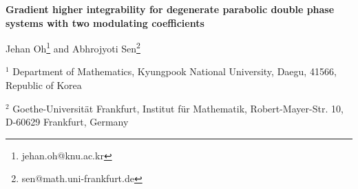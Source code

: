 \documentclass[11pt,oneside, english,reqno,twoside a4paper]{amsart}
\theoremstyle{definition}
\numberwithin{theorem}{section}
\numberwithin{equation}{section}
\DeclareMathOperator{\dv}{div}
\newcommand{\ttl}{}
\begin{document}
\title[Higher integrability for parabolic double phase problems]
{\ttl}
\begin{center}
{\bf \Large Gradient higher integrability for degenerate parabolic double phase systems with two modulating coefficients}


\medskip

{\small  Jehan Oh\footnote{jehan.oh@knu.ac.kr} and Abhrojyoti Sen\footnote{sen@math.uni-frankfurt.de}
}
\medskip

{\small
$^1$ Department of Mathematics, Kyungpook National University, Daegu, 41566,\\
Republic of Korea}

\medskip
{\small
$^2$ Goethe-Universit\"{a}t Frankfurt, Institut f\"{u}r Mathematik, Robert-Mayer-Str. 10,\\
D-60629 Frankfurt, Germany} 
 





\begin{abstract} We establish an interior gradient higher integrability result for weak solutions to degenerate parabolic double phase systems involving two modulating coefficients. To be more precise, we study systems of the form
\begin{align*}
    u_t-\dv \left(a(z)|Du|^{p-2}Du+ b(z)|Du|^{q-2}Du\right)=-\dv \left(a(z)|F|^{p-2}F+ b(z)|F|^{q-2}F\right),
\end{align*}
where $2\leq p\leq q < \infty$ and the modulating coefficients $a(z)$ and $b(z)$ are non-negative, with $a(z)$ being uniformly continuous and $b(z)$ being H\"{o}lder continuous. We further assume that the sum of two modulating coefficients is bounded from below by some positive constant. To establish the gradient higher integrability result, we introduce a suitable intrinsic geometry and develop a delicate comparison scheme to separate and analyze the different phases--namely, the $p$-phase, $q$-phase and $(p,q)$-phase. To the best of our knowledge, this is the first regularity result in the parabolic setting that addresses general double phase systems within the framework of weak solutions.
\end{abstract}
\end{center}
\end{document}
